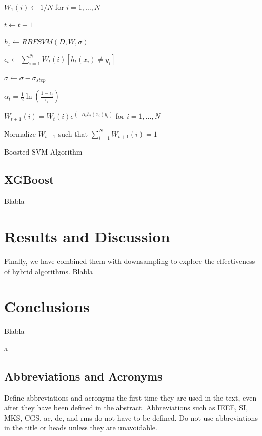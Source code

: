 \documentclass[conference]{IEEEtran}
\begin{document}
\begin{algorithm}
  
  $W_1(i) \leftarrow 1/N$ for $i=1,\dots,N$ %
  
    {
        $t \leftarrow t+1$
        
        $h_t \leftarrow RBFSVM(D,W,\sigma)$ 
        
        $\epsilon_t \leftarrow \sum^N_{i=1}W_t(i)[h_t(x_i)\neq y_i]$
        
        		{
		
		$\sigma \leftarrow \sigma - \sigma_{step}$
		
		}
	\Else
	{
	$\alpha_t = \frac{1}{2}\ln \left( \frac{1-\epsilon_t}{\epsilon_t} \right)$
	
	  
	 $W_{t+1}(i) = W_t(i) e^{(-\alpha_th_t(x_i)y_i)}$ for $i=1,\dots,N$
	 
	 Normalize $W_{t+1}$ such that $\sum^N_{i=1}W_{t+1}(i)=1$
	 }
    }
\caption{Boosted SVM Algorithm}
\end{algorithm}

\subsection{XGBoost}
Blabla

\section{Results and Discussion}
Finally, we have combined them with downsampling to explore the effectiveness of hybrid algorithms.
Blabla 

\section{Conclusions}
Blabla 

\newpage
a
\newpage

\subsection{Abbreviations and Acronyms}\label{AA}
Define abbreviations and acronyms the first time they are used in the text, 
even after they have been defined in the abstract. Abbreviations such as 
IEEE, SI, MKS, CGS, ac, dc, and rms do not have to be defined. Do not use 
abbreviations in the title or heads unless they are unavoidable.
\end{document}
